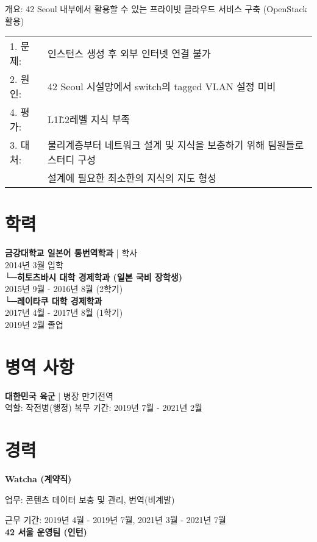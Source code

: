 \documentclass[11pt, a4paper]{article}
\begin{document}
개요: 42 Seoul 내부에서 활용할 수 있는 프라이빗 클라우드 서비스 구축 (OpenStack 활용)\\

\begin{tabular}{l l}
    1. 문제:&인스턴스 생성 후 외부 인터넷 연결 불가\\
    2. 원인:&42 Seoul 시설망에서 switch의 tagged VLAN 설정 미비\\
    4. 평가:&L1\~L2레벨 지식 부족\\
    3. 대처:&물리계층부터 네트워크 설계 및 지식을 보충하기 위해 팀원들로 스터디 구성\\
            &설계에 필요한 최소한의 지식의 지도 형성\\
\end{tabular}


\section{학력}
\textbf{금강대학교 일본어 통번역학과} | 학사\\
2014년 3월 입학\\
\hspace*{0.5cm}└─\textbf{히토츠바시 대학 경제학과 (일본 국비 장학생)}\\
\hspace*{1cm}2015년 9월 - 2016년 8월 (2학기)\\
\hspace*{0.5cm}└─\textbf{레이타쿠 대학 경제학과}\\
\hspace*{1cm}2017년 4월 - 2017년 8월 (1학기)\\
2019년 2월 졸업\\

\section{병역 사항}
\textbf{대한민국 육군} | 병장 만기전역\\
역할: 작전병(행정)
복무 기간: 2019년 7월 - 2021년 2월

\section{경력}
\textbf{Watcha (계약직)}

업무: 콘텐츠 데이터 보충 및 관리, 번역(비계발)

근무 기간: 2019년 4월 - 2019년 7월, 2021년 3월 - 2021년 7월\\
\textbf{42 서울 운영팀 (인턴)}
\end{document}
